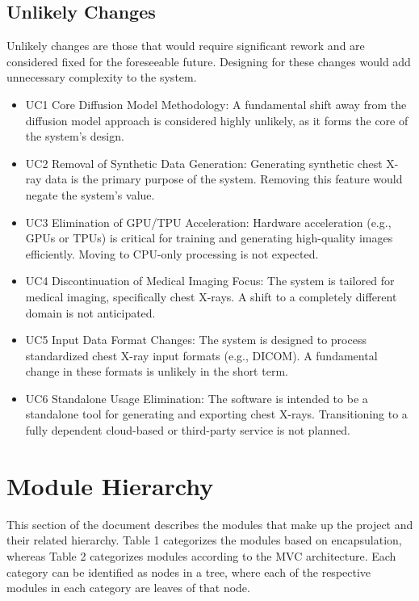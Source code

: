 \documentclass[12pt, titlepage]{article}
\begin{document}
\subsection{Unlikely Changes} \label{SecUchange}

Unlikely changes are those that would require significant rework and are considered fixed for the foreseeable future. Designing for these changes would add unnecessary complexity to the system.

\begin{itemize}
\item UC1 Core Diffusion Model Methodology:
A fundamental shift away from the diffusion model approach is considered highly unlikely, as it forms the core of the system's design.
\item UC2 Removal of Synthetic Data Generation:
Generating synthetic chest X-ray data is the primary purpose of the system. Removing this feature would negate the system’s value.
\item UC3 Elimination of GPU/TPU Acceleration:
Hardware acceleration (e.g., GPUs or TPUs) is critical for training and generating high-quality images efficiently. Moving to CPU-only processing is not expected.
\item UC4 Discontinuation of Medical Imaging Focus:
The system is tailored for medical imaging, specifically chest X-rays. A shift to a completely different domain is not anticipated.
\item UC5 Input Data Format Changes:
The system is designed to process standardized chest X-ray input formats (e.g., DICOM). A fundamental change in these formats is unlikely in the short term.
\item UC6 Standalone Usage Elimination:
The software is intended to be a standalone tool for generating and exporting chest X-rays. Transitioning to a fully dependent cloud-based or third-party service is not planned.
\end{itemize}

\section{Module Hierarchy} \label{SecMH}

This section of the document describes the modules that make up the project and their related hierarchy. Table 1 categorizes the modules based on encapsulation, whereas Table 2 categorizes modules according to the MVC architecture. Each category can be identified as nodes in a tree, where each of the respective modules in each category are leaves of that node.
\end{document}
